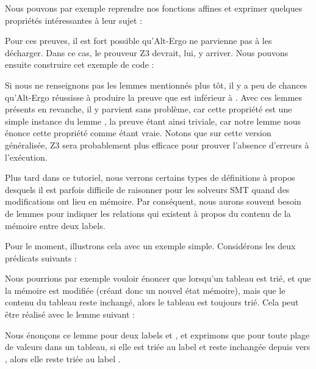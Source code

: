 

Nous pouvons par exemple reprendre nos fonctions affines et exprimer quelques
propriétés intéressantes à leur sujet :






Pour ces preuves, il est fort possible qu'Alt-Ergo ne parvienne pas à les
décharger. Dans ce cas, le prouveur Z3 devrait, lui, y arriver. Nous pouvons
ensuite construire cet exemple de code :






Si nous ne renseignons pas les lemmes mentionnés plus tôt, il y a peu de chances
qu'Alt-Ergo réussisse à produire la preuve que  est inférieur à .
Avec ces lemmes présents en revanche, il y parvient sans problème, car cette
propriété est une simple instance du lemme , la preuve
étant ainsi triviale, car notre lemme nous énonce cette propriété comme étant vraie.
Notons que sur cette version généralisée, Z3 sera probablement plus efficace pour
prouver l'absence d'erreurs à l'exécution.





Plus tard dans ce tutoriel, nous verrons certains types de définitions à propos
desquels il est parfois difficile de raisonner pour les solveurs SMT quand des
modifications ont lieu en mémoire. Par conséquent, nous aurons souvent besoin de
lemmes pour indiquer les relations qui existent à propos du contenu de la mémoire
entre deux labels.


Pour le moment, illustrons cela avec un exemple simple. Considérons les deux
prédicats suivants :




Nous pourrions par exemple vouloir énoncer que lorsqu'un tableau est trié, et que
la mémoire est modifiée (créant donc un nouvel état mémoire), mais que le contenu du
tableau reste inchangé, alors le tableau est toujours trié. Cela peut être réalisé
avec le lemme suivant :




Nous énonçons ce lemme pour deux labels  et , et
exprimons que pour toute plage de valeurs dans un tableau, si elle est triée au label
 et reste inchangée depuis  vers ,
alors elle reste triée au label .


